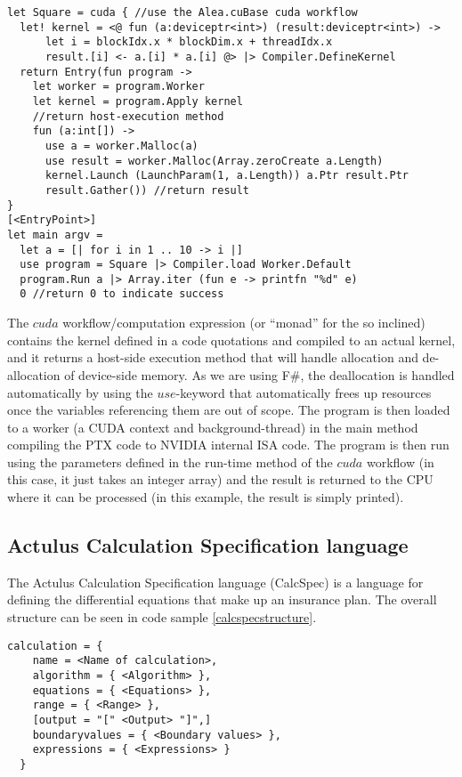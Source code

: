 {\begin{lstlisting}[caption=Alea.cuBase square kernel, label=cubase_add]
let Square = cuda { //use the Alea.cuBase cuda workflow
  let! kernel = <@ fun (a:deviceptr<int>) (result:deviceptr<int>) ->
      let i = blockIdx.x * blockDim.x + threadIdx.x
      result.[i] <- a.[i] * a.[i] @> |> Compiler.DefineKernel
  return Entry(fun program ->
    let worker = program.Worker
    let kernel = program.Apply kernel
    //return host-execution method
    fun (a:int[]) ->
      use a = worker.Malloc(a)
      use result = worker.Malloc(Array.zeroCreate a.Length)
      kernel.Launch (LaunchParam(1, a.Length)) a.Ptr result.Ptr
      result.Gather()) //return result
}
[<EntryPoint>]
let main argv = 
  let a = [| for i in 1 .. 10 -> i |]
  use program = Square |> Compiler.load Worker.Default
  program.Run a |> Array.iter (fun e -> printfn "%d" e)
  0 //return 0 to indicate success
\end{lstlisting}

The $cuda$ workflow/computation expression (or ``monad'' for the so inclined) contains the kernel defined in a code quotations and compiled to an actual kernel, and it returns a host-side execution method that will handle allocation and de-allocation of device-side memory. 
As we are using F\#, the deallocation is handled automatically by using the $use$-keyword that automatically frees up resources once the variables referencing them are out of scope. 
The program is then loaded to a worker (a CUDA context and background-thread) in the main method compiling the PTX code to NVIDIA internal ISA code. %
The program is then run using the parameters defined in the run-time method of the $cuda$ workflow (in this case, it just takes an integer array) and the result is returned to the CPU where it can be processed (in this example, the result is simply printed).

\subsection{Actulus Calculation Specification language}
The Actulus Calculation Specification language (CalcSpec) is a language for defining the differential equations that make up an insurance plan. The overall structure can be seen in code sample \ref{calcspecstructure}.


\begin{lstlisting}[caption=CalcSpec structure, label=calcspecstructure]
calculation = {
    name = <Name of calculation>,
    algorithm = { <Algorithm> },
    equations = { <Equations> },
    range = { <Range> },
    [output = "[" <Output> "]",]
    boundaryvalues = { <Boundary values> },
    expressions = { <Expressions> }
  }
\end{lstlisting}

}
